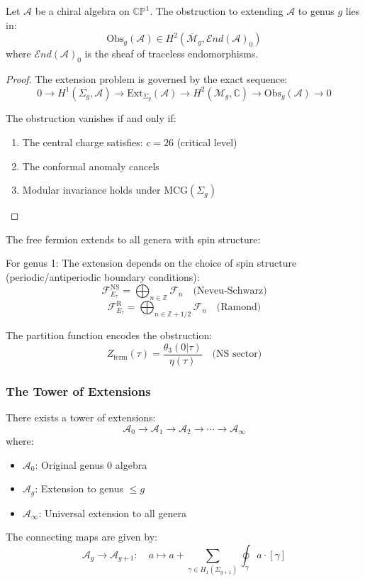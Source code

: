 \begin{theorem}
Let $\mathcal{A}$ be a chiral algebra on $\mathbb{CP}^1$. The obstruction to extending $\mathcal{A}$ to genus $g$ lies in:
\[
\text{Obs}_g(\mathcal{A}) \in H^2(\overline{\mathcal{M}}_g, \mathcal{E}nd(\mathcal{A})_0)
\]
where $\mathcal{E}nd(\mathcal{A})_0$ is the sheaf of traceless endomorphisms.
\end{theorem}

\begin{proof}
The extension problem is governed by the exact sequence:
\[
0 \to H^1(\Sigma_g, \mathcal{A}) \to \text{Ext}_{\Sigma_g}(\mathcal{A}) \to H^2(\mathcal{M}_g, \mathbb{C}) \to \text{Obs}_g(\mathcal{A}) \to 0
\]

The obstruction vanishes if and only if:
\begin{enumerate}
\item The central charge satisfies: $c = 26$ (critical level)
\item The conformal anomaly cancels
\item Modular invariance holds under $\text{MCG}(\Sigma_g)$
\end{enumerate}
\end{proof}

\begin{example}
The free fermion extends to all genera with spin structure:

For genus 1: The extension depends on the choice of spin structure (periodic/antiperiodic boundary conditions):
\[
\mathcal{F}_{E_\tau}^{\text{NS}} = \bigoplus_{n \in \mathbb{Z}} \mathcal{F}_n \quad \text{(Neveu-Schwarz)}
\]
\[
\mathcal{F}_{E_\tau}^{\text{R}} = \bigoplus_{n \in \mathbb{Z} + 1/2} \mathcal{F}_n \quad \text{(Ramond)}
\]

The partition function encodes the obstruction:
\[
Z_{\text{ferm}}(\tau) = \frac{\theta_3(0|\tau)}{\eta(\tau)} \quad \text{(NS sector)}
\]
\end{example}

\subsubsection{The Tower of Extensions}

\begin{theorem}
There exists a tower of extensions:
\[
\mathcal{A}_0 \to \mathcal{A}_1 \to \mathcal{A}_2 \to \cdots \to \mathcal{A}_\infty
\]
where:
\begin{itemize}
\item $\mathcal{A}_0$: Original genus 0 algebra
\item $\mathcal{A}_g$: Extension to genus $\leq g$
\item $\mathcal{A}_\infty$: Universal extension to all genera
\end{itemize}

The connecting maps are given by:
\[
\mathcal{A}_g \to \mathcal{A}_{g+1}: \quad a \mapsto a + \sum_{\gamma \in H_1(\Sigma_{g+1})} \oint_\gamma a \cdot [\gamma]
\]
\end{theorem}

